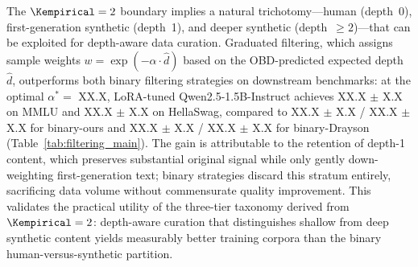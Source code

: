 



The $\Kempirical = 2$ boundary implies a natural trichotomy---human
(depth~0), first-generation synthetic (depth~1), and deeper synthetic
(depth~$\geq 2$)---that can be exploited for depth-aware data curation.
Graduated filtering, which assigns sample weights $w = \exp(-\alpha
\cdot \hat{d})$ based on the OBD-predicted expected depth $\hat{d}$,
outperforms both binary filtering strategies on downstream benchmarks:
at the optimal $\alpha^* = $ XX.X, LoRA-tuned Qwen2.5-1.5B-Instruct
achieves XX.X $\pm$ X.X on MMLU and XX.X $\pm$ X.X on HellaSwag,
compared to XX.X $\pm$ X.X / XX.X $\pm$ X.X for binary-ours and
XX.X $\pm$ X.X / XX.X $\pm$ X.X for binary-Drayson
(Table~\ref{tab:filtering_main}).
The gain is attributable to the retention of depth-1 content, which
preserves substantial original signal while only gently down-weighting
first-generation text; binary strategies discard this stratum entirely,
sacrificing data volume without commensurate quality improvement.
This validates the practical utility of the three-tier taxonomy derived
from $\Kempirical = 2$: depth-aware curation that distinguishes shallow
from deep synthetic content yields measurably better training corpora
than the binary human-versus-synthetic partition.


